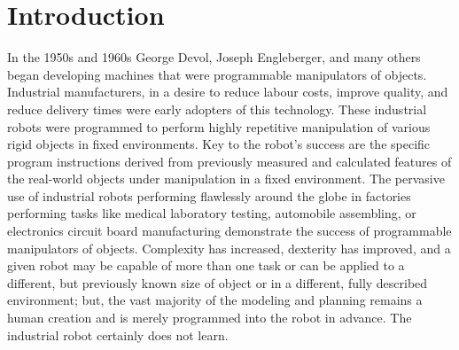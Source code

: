 \chapter{Introduction}

In the 1950s and 1960s George Devol, Joseph Engleberger, and many others began developing machines that were programmable manipulators of objects. Industrial manufacturers, in a desire to reduce labour costs, improve quality, and reduce delivery times were early adopters of this technology. These industrial robots were programmed to perform highly repetitive manipulation of various rigid objects in fixed environments. Key to the robot’s success are the specific program instructions derived from previously measured and calculated features of the real-world objects under manipulation in a fixed environment. The pervasive use of industrial robots performing flawlessly around the globe in factories performing tasks like medical laboratory testing, automobile assembling, or electronics circuit board manufacturing demonstrate the success of programmable manipulators of objects. Complexity has increased, dexterity has improved, and a given robot may be capable of more than one task or can be applied to a different, but previously known size of object or in a different, fully described environment; but, the vast majority of the modeling and planning remains a human creation and is merely programmed into the robot in advance. The industrial robot certainly does not learn.


